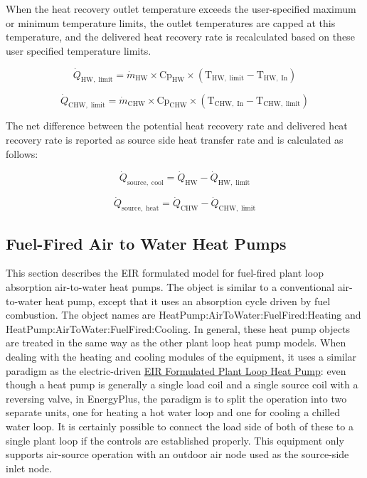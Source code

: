 When the heat recovery outlet temperature exceeds the user-specified maximum or minimum temperature limits, the outlet temperatures are capped at this temperature, and the delivered heat recovery rate is recalculated based on these user specified temperature limits.

\begin{equation}
\dot{Q}_\mathrm{HW,\; limit} = \dot{m}_\mathrm{HW} \times \mathrm{Cp}_\mathrm{HW} \times {(\mathrm{T}_\mathrm{HW,\; limit} - \mathrm{T}_\mathrm{HW,\; In})}
\end{equation}

\begin{equation}
\dot{Q}_\mathrm{CHW,\; limit} = \dot{m}_\mathrm{CHW} \times \mathrm{Cp}_\mathrm{CHW} \times {(\mathrm{T}_\mathrm{CHW,\; In} - \mathrm{T}_\mathrm{CHW,\; limit})}
\end{equation}

The net difference between the potential heat recovery rate and delivered heat recovery rate is reported as source side heat transfer rate and is calculated as follows: 

\begin{equation}
\dot{Q}_\mathrm{source,\; cool} = \dot{Q}_\mathrm{HW} - \dot{Q}_\mathrm{HW,\; limit}
\end{equation}

\begin{equation}
\dot{Q}_\mathrm{source,\; heat} = \dot{Q}_\mathrm{CHW} - \dot{Q}_\mathrm{CHW,\; limit}
\end{equation}


\subsection{Fuel-Fired Air to Water Heat Pumps}\label{fuel-fired-air-to-water-heat-pumps}

This section describes the EIR formulated model for fuel-fired plant loop absorption air-to-water heat pumps. The object is similar to a conventional air-to-water heat pump, except that it uses an absorption cycle driven by fuel combustion. The object names are HeatPump:AirToWater:FuelFired:Heating and HeatPump:AirToWater:FuelFired:Cooling. In general, these heat pump objects are treated in the same way as the other plant loop heat pump models. When dealing with the heating and cooling modules of the equipment, it uses a similar paradigm as the electric-driven \hyperref[eir-plant-loop-heat-pump-model]{EIR Formulated Plant Loop Heat Pump}: even though a heat pump is generally a single load coil and a single source coil with a reversing valve, in EnergyPlus, the paradigm is to split the operation into two separate units, one for heating a hot water loop and one for cooling a chilled water loop. It is certainly possible to connect the load side of both of these to a single plant loop if the controls are established properly. This equipment only supports air-source operation with an outdoor air node used as the source-side inlet node.

